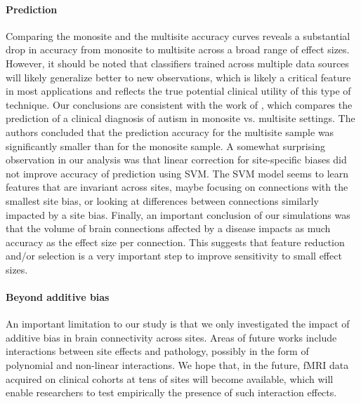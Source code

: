 \documentclass[authoryear]{elsarticle}
\begin{document}
\paragraph{Prediction}
Comparing the monosite and the multisite accuracy curves reveals a substantial
drop in accuracy from monosite to multisite across a broad range of effect
sizes. However, it should be noted that classifiers trained across multiple data
sources will likely generalize better to new observations, which is likely a
critical feature in most applications and reflects the true potential clinical
utility of this type of technique. Our conclusions are consistent with the work of
\citep{Nielsen2013}, which compares the prediction of a clinical diagnosis of
autism in monosite vs. multisite settings. The authors concluded that the
prediction accuracy for the multisite sample was significantly smaller than for
the monosite sample. A somewhat surprising observation in our analysis was that linear
correction for site-specific biases did not improve accuracy of prediction using
SVM. The SVM model seems to learn features that are invariant across sites,
maybe focusing on connections with the smallest site bias, or looking at
differences between connections similarly impacted by a site bias. Finally, an
important conclusion of our simulations was that the volume of brain connections
affected by a disease impacts as much accuracy as the effect size per
connection. This suggests that feature reduction and/or selection is a very
important step to improve sensitivity to small effect sizes.

\paragraph{Beyond additive bias} An important limitation to our study is that we only investigated the impact of additive bias in brain connectivity across sites. Areas of future works include interactions between site effects and pathology, possibly in the form of polynomial and non-linear interactions. We hope that, in the future, fMRI data acquired on clinical cohorts at tens of sites will become available, which will enable researchers to test empirically the presence of such interaction effects. 
\end{document}
